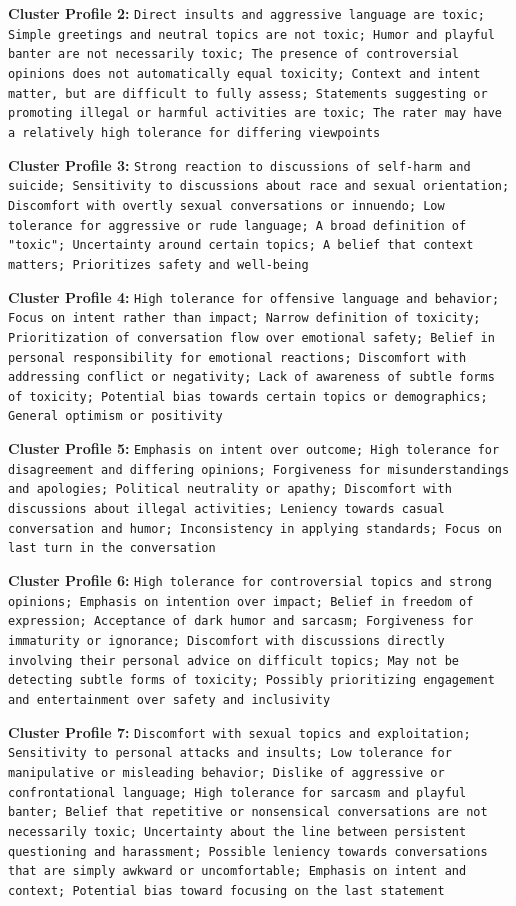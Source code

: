 \documentclass[11pt]{article}
\begin{document}
\textbf{Cluster Profile 2:} \texttt{Direct insults and aggressive language are toxic; Simple greetings and neutral topics are not toxic; Humor and playful banter are not necessarily toxic; The presence of controversial opinions does not automatically equal toxicity; Context and intent matter, but are difficult to fully assess; Statements suggesting or promoting illegal or harmful activities are toxic; The rater may have a relatively high tolerance for differing viewpoints}


\textbf{Cluster Profile 3:} \texttt{Strong reaction to discussions of self-harm and suicide; Sensitivity to discussions about race and sexual orientation; Discomfort with overtly sexual conversations or innuendo; Low tolerance for aggressive or rude language; A broad definition of "toxic"; Uncertainty around certain topics; A belief that context matters; Prioritizes safety and well-being}


\textbf{Cluster Profile 4:} \texttt{High tolerance for offensive language and behavior; Focus on intent rather than impact; Narrow definition of toxicity; Prioritization of conversation flow over emotional safety; Belief in personal responsibility for emotional reactions; Discomfort with addressing conflict or negativity; Lack of awareness of subtle forms of toxicity; Potential bias towards certain topics or demographics; General optimism or positivity}


\textbf{Cluster Profile 5:} \texttt{Emphasis on intent over outcome; High tolerance for disagreement and differing opinions; Forgiveness for misunderstandings and apologies; Political neutrality or apathy; Discomfort with discussions about illegal activities; Leniency towards casual conversation and humor; Inconsistency in applying standards; Focus on last turn in the conversation}


\textbf{Cluster Profile 6:} \texttt{High tolerance for controversial topics and strong opinions; Emphasis on intention over impact; Belief in freedom of expression; Acceptance of dark humor and sarcasm; Forgiveness for immaturity or ignorance; Discomfort with discussions directly involving their personal advice on difficult topics; May not be detecting subtle forms of toxicity; Possibly prioritizing engagement and entertainment over safety and inclusivity}


\textbf{Cluster Profile 7:} \texttt{Discomfort with sexual topics and exploitation; Sensitivity to personal attacks and insults; Low tolerance for manipulative or misleading behavior; Dislike of aggressive or confrontational language; High tolerance for sarcasm and playful banter; Belief that repetitive or nonsensical conversations are not necessarily toxic; Uncertainty about the line between persistent questioning and harassment; Possible leniency towards conversations that are simply awkward or uncomfortable; Emphasis on intent and context; Potential bias toward focusing on the last statement}
\end{document}
